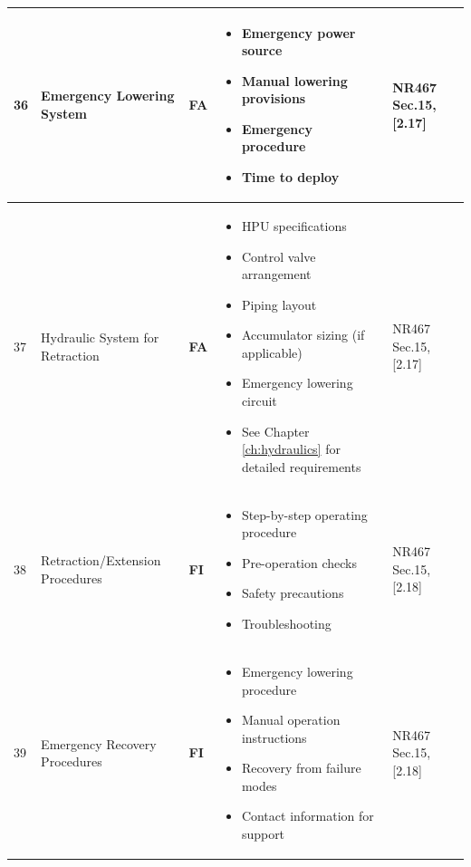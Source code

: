 \documentclass[11pt,a4paper]{report}
\newcommand{\fa}{\textbf{\textcolor{warningred}{FA}}}
\newcommand{\fic}{\textbf{\textcolor{bvgray}{FI}}}
\begin{document}
\begin{longtable}{|p{0.5cm}|p{5cm}|p{1.5cm}|p{5.5cm}|p{2cm}|}
36 & Emergency Lowering System & \fa{} & 
\begin{itemize}[leftmargin=*,nosep]
\item Emergency power source
\item Manual lowering provisions
\item Emergency procedure
\item Time to deploy
\end{itemize} & NR467 Sec.15, [2.17] \\
\hline

37 & Hydraulic System for Retraction & \fa{} & 
\begin{itemize}[leftmargin=*,nosep]
\item HPU specifications
\item Control valve arrangement
\item Piping layout
\item Accumulator sizing (if applicable)
\item Emergency lowering circuit
\item See Chapter \ref{ch:hydraulics} for detailed requirements
\end{itemize} & NR467 Sec.15, [2.17] \\
\hline

38 & Retraction/Extension Procedures & \fic{} & 
\begin{itemize}[leftmargin=*,nosep]
\item Step-by-step operating procedure
\item Pre-operation checks
\item Safety precautions
\item Troubleshooting
\end{itemize} & NR467 Sec.15, [2.18] \\
\hline

39 & Emergency Recovery Procedures & \fic{} & 
\begin{itemize}[leftmargin=*,nosep]
\item Emergency lowering procedure
\item Manual operation instructions
\item Recovery from failure modes
\item Contact information for support
\end{itemize} & NR467 Sec.15, [2.18] \\
\hline

\end{longtable}

\newpage
\end{document}
